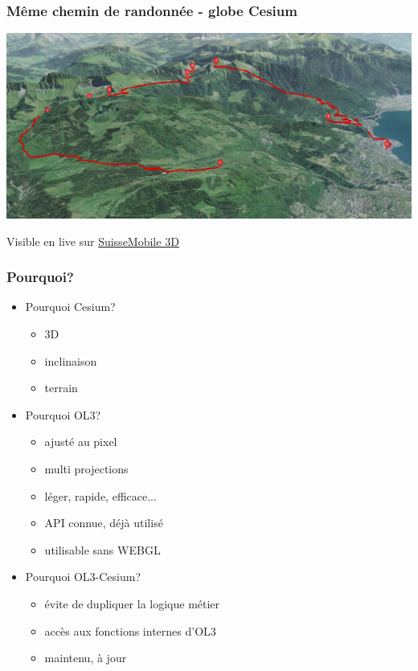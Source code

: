 \documentclass{beamer}
\begin{document}
  \begin{frame}
    \frametitle{Même chemin de randonnée - globe Cesium}
		\begin{center}
		  \includegraphics[width=1.0 \linewidth]{./vtt_3d2.png}
		\end{center}
    Visible en live sur \href{https://map.schweizmobil.ch/?cesium&trackId=2149217}{SuisseMobile 3D}
  \end{frame}



  \begin{frame}
    \frametitle{Pourquoi?}
	\begin{itemize}
	  \item Pourquoi Cesium?
	  \begin{itemize}
	    \item 3D
	    \item inclinaison
	    \item terrain
	  \end{itemize}
	  \pause

	  \item Pourquoi OL3?
 	  \begin{itemize}
	    \item ajusté au pixel
	    \item multi projections
	    \item léger, rapide, efficace...
	    \item API connue, déjà utilisé
	    \item utilisable sans WEBGL
	  \end{itemize}
	  \pause

	  \item Pourquoi OL3-Cesium?
 	  \begin{itemize}
	    \item évite de dupliquer la logique métier
	    \item accès aux fonctions internes d'OL3
	    \item maintenu, à jour
	  \end{itemize}
    \end{itemize}
  \end{frame}
  
\end{document}
